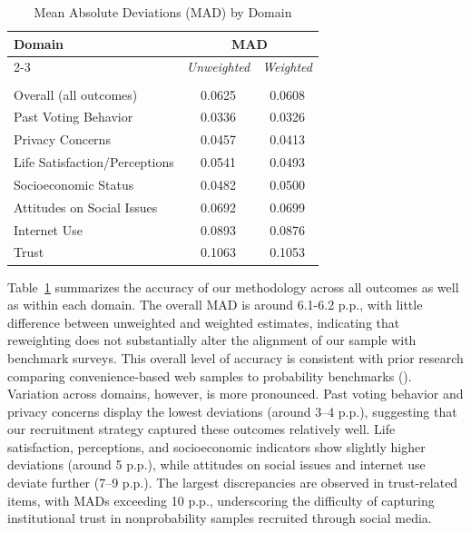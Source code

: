 \documentclass[letterpaper,12pt]{article}
\theoremstyle{proposition}
\begin{document}
\begin{table}[h]
\centering
\caption{Mean Absolute Deviations (MAD) by Domain}
\label{tab:mad_outcomes}
\vspace{0.5cm}
\begin{tabular}{l cc}
\hline\hline
\textbf{Domain} & \multicolumn{2}{c}{\textbf{MAD}} \\
\cline{2-3}
       & \textit{Unweighted} & \textit{Weighted} \\
\hline \vspace{-0.3cm} \\
\vspace{0.5cm}Overall (all outcomes)        & 0.0625 & 0.0608 \vspace{-0.3cm} \\ \hdashline
Past Voting Behavior          & 0.0336 & 0.0326 \\
Privacy Concerns              & 0.0457 & 0.0413 \\
Life Satisfaction/Perceptions & 0.0541 & 0.0493 \\
Socioeconomic Status          & 0.0482 & 0.0500 \\
Attitudes on Social Issues    & 0.0692 & 0.0699 \\
Internet Use                  & 0.0893 & 0.0876 \\
Trust                         & 0.1063 & 0.1053 \\
\hline\hline
\end{tabular}
\end{table}

Table~\ref{tab:mad_outcomes} summarizes the accuracy of our methodology across all outcomes as well as within each domain. The overall MAD is around 6.1-6.2 p.p., with little difference between unweighted and weighted estimates, indicating that reweighting does not substantially alter the alignment of our sample with benchmark surveys. This overall level of accuracy is consistent with prior research comparing convenience-based web samples to probability benchmarks (\citealt{goel2015non, yeager2011comparing, Mercer2018}). Variation across domains, however, is more pronounced. Past voting behavior and privacy concerns display the lowest deviations (around 3–4 p.p.), suggesting that our recruitment strategy captured these outcomes relatively well. Life satisfaction, perceptions, and socioeconomic indicators show slightly higher deviations (around 5 p.p.), while attitudes on social issues and internet use deviate further (7–9 p.p.). The largest discrepancies are observed in trust-related items, with MADs exceeding 10 p.p., underscoring the difficulty of capturing institutional trust in nonprobability samples recruited through social media.
\end{document}
